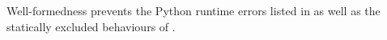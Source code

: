 Well-formedness prevents the Python runtime errors listed in  as well as the statically
excluded behaviours of .



